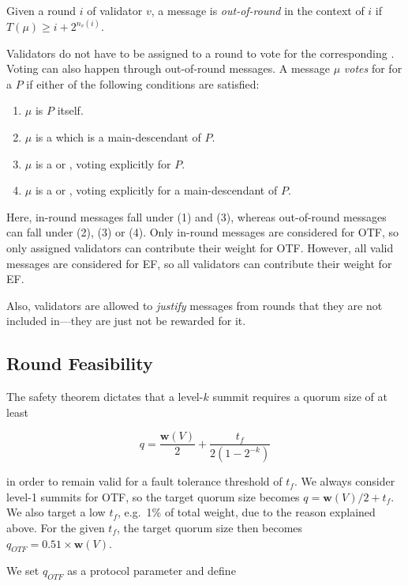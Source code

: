 Given a round $i$ of validator $v$, a message is \emph{out-of-round} in the context of $i$ if $T(\mu)\geq i+2^{n_v(i)}$.

Validators do not have to be assigned to a round to vote for the corresponding \PROP. Voting can also happen through out-of-round messages. A message $\mu$ \emph{votes} for for a \PROP $P$ if either of the following conditions are satisfied:

\begin{enumerate}
\def\labelenumi{\arabic{enumi}.}
\item $\mu$ is $P$ itself.
\item $\mu$ is a \PROP which is a main-descendant of $P$.
\item $\mu$ is a \CONF or \WIT, voting explicitly for $P$.
\item $\mu$ is a \CONF or \WIT, voting explicitly for a main-descendant of $P$.
\end{enumerate}

Here, in-round messages fall under (1) and (3), whereas out-of-round messages can fall under (2), (3) or (4). Only in-round messages are considered for OTF, so only assigned validators can contribute their weight for OTF. However, all valid messages are considered for EF, so all validators can contribute their weight for EF.

Also, validators are allowed to \emph{justify} messages from rounds that they are not included in---they are just not be rewarded for it.

\subsection{Round Feasibility}
\label{sec:round-feasibility}

The safety theorem dictates that a level-$k$ summit requires a quorum size of at least

\begin{equation}
q = \frac{\boldsymbol{w}(V)}{2} + \frac{t_f}{2(1-2^{-k})}
\end{equation}

in order to remain valid for a fault tolerance threshold of $t_f$. We always consider level-1 summits for OTF, so the target quorum size becomes $q=\boldsymbol{w}(V)/2+t_f$. We also target a low $t_f$, e.g.~1\% of total weight, due to the reason explained above. For the given $t_f$, the target quorum size then becomes $q_{OTF} = 0.51 \times \boldsymbol{w}(V)$.

We set $q_{OTF}$ as a protocol parameter and define

